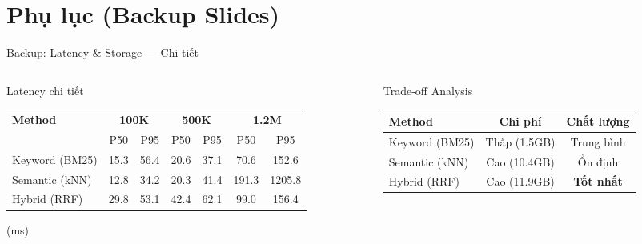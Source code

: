 \appendix
\section{Phụ lục (Backup Slides)}

\begin{frame}{Backup: Latency \& Storage --- Chi tiết}
\begin{columns}[T]
\begin{column}{0.60\textwidth}

\begin{block}{Latency chi tiết}
\centering
\setlength{\tabcolsep}{2pt}
{\scriptsize
\begin{tabular}{l *{6}{c}}
\toprule
\multirow{2}{*}{\textbf{Method}} & \multicolumn{2}{c}{\textbf{100K}} & \multicolumn{2}{c}{\textbf{500K}} & \multicolumn{2}{c}{\textbf{1.2M}} \\
\cmidrule(lr){2-3} \cmidrule(lr){4-5} \cmidrule(lr){6-7}
& P50 & P95 & P50 & P95 & P50 & P95 \\
\midrule
Keyword (BM25) & 15.3 & 56.4 & 20.6 & 37.1 & 70.6 & 152.6 \\
Semantic (kNN) & 12.8 & 34.2 & 20.3 & 41.4 & 191.3 & 1205.8 \\
\rowcolor{highlightRow}
\textcolor{accentTeal}{Hybrid (RRF)} & \textcolor{accentTeal}{29.8} & \textcolor{accentTeal}{53.1} & \textcolor{accentTeal}{42.4} & \textcolor{accentTeal}{62.1} & \textcolor{accentTeal}{99.0} & \textcolor{accentTeal}{156.4} \\
\bottomrule
\end{tabular}
}
{\scriptsize (ms)}
\end{block}

\end{column}
\begin{column}{0.36\textwidth}

\begin{block}{Trade-off Analysis}
\setlength{\tabcolsep}{3pt}
{\scriptsize
\begin{tabular}{l c c}
\toprule
\textbf{Method} & \textbf{Chi phí} & \textbf{Chất lượng} \\
\midrule
Keyword (BM25) & Thấp (1.5GB) & Trung bình \\
Semantic (kNN) & Cao (10.4GB) & Ổn định \\
\rowcolor{highlightRow}
\textcolor{accentTeal}{Hybrid (RRF)} & Cao (11.9GB) & \textcolor{accentTeal}{\textbf{Tốt nhất}} \\
\bottomrule
\end{tabular}
}
\end{block}

\end{column}
\end{columns}
\end{frame}

